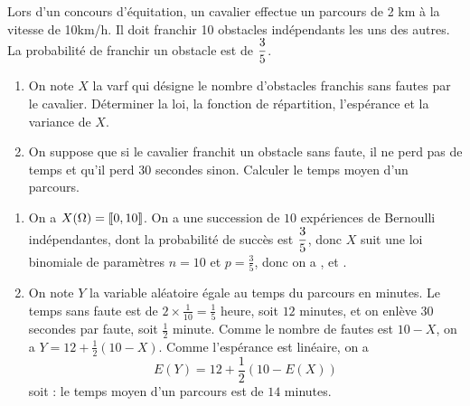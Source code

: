 \documentclass[a4paper, 11pt,reqno]{article}
\begin{document}
\begin{exercice}  \;
	Lors d'un concours d'\'equitation, un cavalier effectue un parcours de 2 km \`a la vitesse de 10km/h. Il doit franchir 10 obstacles ind\'ependants les uns des autres. La probabilit\'e de franchir un obstacle est de $\displaystyle\frac{3}{5}$.
	\begin{enumerate}
		\item On note $X$ la varf qui d\'esigne le nombre d'obstacles franchis sans fautes par le cavalier. D\'eterminer la loi, la fonction de r\'epartition, l'esp\'erance et la variance de $X$.
		\item On suppose que si le cavalier franchit un obstacle sans faute, il ne perd pas de temps et qu'il perd 30 secondes sinon. Calculer le temps moyen d'un parcours.
	\end{enumerate}
\end{exercice}
\begin{correction}  \;
	\begin{enumerate}
		\item On a $X(\Omega) = \llbracket  0,10\rrbracket$. On a une succession de $10$ exp\'eriences de Bernoulli ind\'ependantes, dont la probabilit\'e de succ\`es est $\displaystyle \frac{3}{5}$, donc $X$ suit une loi binomiale de param\`etres $n=10$ et $p=\frac{3}{5}$, donc on a ,  et .
		\item On note $Y$ la variable al\'eatoire \'egale au temps du parcours en minutes. Le temps sans faute est de $2\times \frac{1}{10}= \frac{1}{5}$ heure, soit $12$ minutes, et on enl\`eve $30$ secondes par faute, soit $\frac{1}{2}$ minute. Comme le nombre de fautes est $10-X$, on a $Y = 12 + \frac{1}{2}(10-X).$ Comme l'esp\'erance est lin\'eaire, on a
		      $$E(Y) = 12 + \frac{1}{2}(10-E(X))$$
		      soit  : le temps moyen d'un parcours est de $14$ minutes.
	\end{enumerate}
\end{correction}
\end{document}
